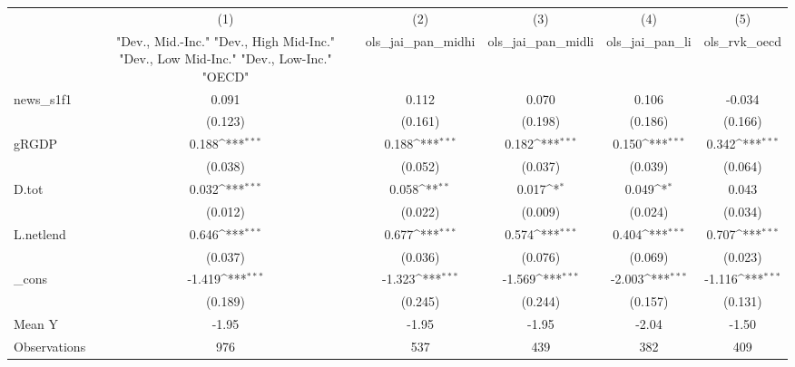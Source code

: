 {
\def\sym#1{\ifmmode^{#1}\else\(^{#1}\)\fi}
\begin{tabular}{l*{5}{c}}
\toprule
            &\multicolumn{1}{c}{(1)}&\multicolumn{1}{c}{(2)}&\multicolumn{1}{c}{(3)}&\multicolumn{1}{c}{(4)}&\multicolumn{1}{c}{(5)}\\
            &\multicolumn{1}{c}{ "Dev., Mid.-Inc." "Dev., High Mid-Inc." "Dev., Low Mid-Inc." "Dev., Low-Inc." "OECD" }&\multicolumn{1}{c}{ols\_jai\_pan\_midhi}&\multicolumn{1}{c}{ols\_jai\_pan\_midli}&\multicolumn{1}{c}{ols\_jai\_pan\_li}&\multicolumn{1}{c}{ols\_rvk\_oecd}\\
\midrule
news\_s1f1   &       0.091         &       0.112         &       0.070         &       0.106         &      -0.034         \\
            &     (0.123)         &     (0.161)         &     (0.198)         &     (0.186)         &     (0.166)         \\
\addlinespace
gRGDP       &       0.188\sym{***}&       0.188\sym{***}&       0.182\sym{***}&       0.150\sym{***}&       0.342\sym{***}\\
            &     (0.038)         &     (0.052)         &     (0.037)         &     (0.039)         &     (0.064)         \\
\addlinespace
D.tot       &       0.032\sym{***}&       0.058\sym{**} &       0.017\sym{*}  &       0.049\sym{*}  &       0.043         \\
            &     (0.012)         &     (0.022)         &     (0.009)         &     (0.024)         &     (0.034)         \\
\addlinespace
L.netlend   &       0.646\sym{***}&       0.677\sym{***}&       0.574\sym{***}&       0.404\sym{***}&       0.707\sym{***}\\
            &     (0.037)         &     (0.036)         &     (0.076)         &     (0.069)         &     (0.023)         \\
\addlinespace
\_cons      &      -1.419\sym{***}&      -1.323\sym{***}&      -1.569\sym{***}&      -2.003\sym{***}&      -1.116\sym{***}\\
            &     (0.189)         &     (0.245)         &     (0.244)         &     (0.157)         &     (0.131)         \\
\midrule
Mean Y      &       -1.95         &       -1.95         &       -1.95         &       -2.04         &       -1.50         \\
Observations&         976         &         537         &         439         &         382         &         409         \\
\bottomrule
\end{tabular}
}
